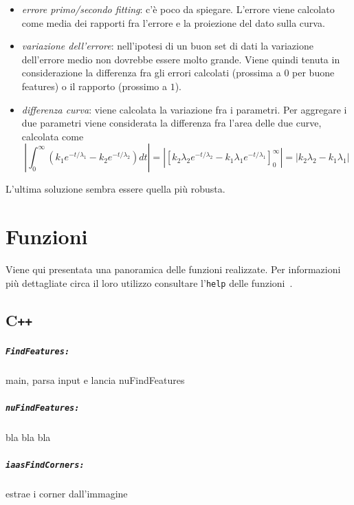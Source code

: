 \documentclass[12pt]{report}
\begin{document}
\begin{itemize}
	\item	\emph{errore primo/secondo fitting}: c'\`e poco da spiegare. L'errore viene calcolato come media dei rapporti fra l'errore e la proiezione del dato sulla curva.
	\item	\emph{variazione dell'errore}: nell'ipotesi di un buon set di dati la variazione dell'errore medio non dovrebbe essere molto grande. Viene quindi tenuta in considerazione la differenza fra gli errori calcolati (prossima a $0$ per buone features) o il rapporto (prossimo a $1$).
	\item	\emph{differenza curva}: viene calcolata la variazione fra i parametri. Per aggregare i due parametri viene considerata la differenza fra l'area delle due curve, calcolata come $$\left|\int^{\infty}_0\left(k_1e^{-t/\lambda_1} - k_2e^{-t/\lambda_2}\right)dt\right| = \left|\left[ k_2\lambda_2e^{-t/\lambda_2} - k_1\lambda_1e^{-t/\lambda_1} \right]^\infty_0\right| = \left|k_2\lambda_2 - k_1\lambda_1\right|$$
\end{itemize}

L'ultima soluzione sembra essere quella pi\`u robusta.



\chapter{Funzioni}

Viene qui presentata una panoramica delle funzioni realizzate. Per informazioni pi\`u dettagliate circa il loro utilizzo consultare l'\verb|help| delle funzioni~\cite{lucaskanade81}.

\section[C++]{C\verb_++_}

\paragraph*{\verb_FindFeatures:_} main, parsa input e lancia nuFindFeatures

\paragraph*{\verb_nuFindFeatures:_} bla bla bla

\paragraph*{\verb_iaasFindCorners:_} estrae i corner dall'immagine
\end{document}
